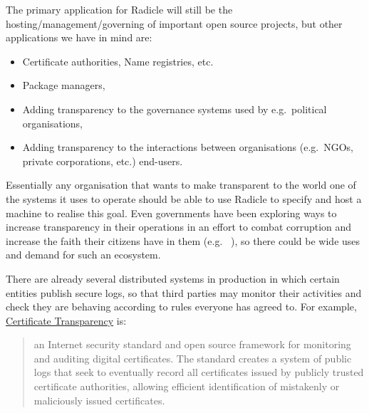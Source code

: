 \documentclass[a4paper, oneside, 10pt]{amsart}
\newcommand*\eg{e.g.\ }
\begin{document}
The primary application for Radicle will still be the
hosting/management/governing of important open source projects, but other
applications we have in mind are:
\begin{itemize}
\item
  Certificate authorities, Name registries, etc.
\item
  Package managers,
\item
  Adding transparency to the governance systems used by e.g.~political
  organisations,
\item
  Adding transparency to the interactions between organisations
  (e.g.~NGOs, private corporations, etc.) end-users.
\end{itemize}

Essentially any organisation that wants to make transparent to the world one of
the systems it uses to operate should be able to use Radicle to specify and host
a machine to realise this goal. Even governments have been exploring ways to
increase transparency in their operations in an effort to combat corruption and
increase the faith their citizens have in them (\eg
\cite{ukraine-transparency}), so there could be wide uses and demand for such an
ecosystem.

There are already several distributed systems in production in which
certain entities publish secure logs, so that third parties may monitor
their activities and check they are behaving according to rules everyone
has agreed to. For example,
\href{https://en.wikipedia.org/wiki/Certificate_Transparency}{Certificate
Transparency} is:
\begin{quote}
an Internet security standard and open source framework for monitoring and
auditing digital certificates. The standard creates a system of public logs that
seek to eventually record all certificates issued by publicly trusted
certificate authorities, allowing efficient identification of mistakenly or
maliciously issued certificates.
\end{quote}
\end{document}
